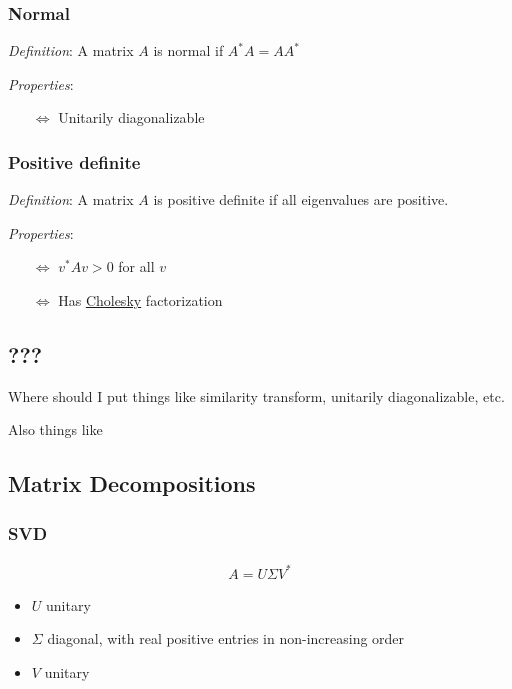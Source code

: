 \documentclass[12pt]{article}
\begin{document}
\subsubsection{Normal}
\label{sec:normal}
\textit{Definition}: A matrix \( A \) is normal if \( A^*A = AA^* \)

\textit{Properties}:
\begin{itemize}[nolistsep]
    \item[\(\Leftrightarrow\)] Unitarily diagonalizable  
\end{itemize}


\subsubsection{Positive definite}
\textit{Definition}: A matrix \( A \) is positive definite if all eigenvalues are positive.

\textit{Properties}:
\begin{itemize}[nolistsep]
    \item[\(\Leftrightarrow\)] \( v^*Av > 0 \) for all \( v \)
    \item[\(\Leftrightarrow\)] Has \hyperref[sec:cholesky]{Cholesky} factorization
\end{itemize}


\subsection{???}
Where should I put things like similarity transform, unitarily diagonalizable, etc.

Also things like 


\subsection{Matrix Decompositions}
\subsubsection{SVD}
\begin{align*}
    A = U\Sigma V^*
\end{align*}

\begin{itemize}[nolistsep]
    \item \( U \) unitary
    \item \( \Sigma \) diagonal, with real positive entries in non-increasing order
    \item \( V \) unitary
\end{itemize}
\end{document}
